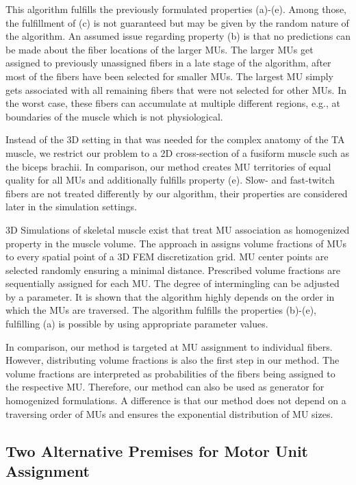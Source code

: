 This algorithm fulfills the previously formulated properties (a)-(e). Among those, the fulfillment of (c) is not guaranteed but may be given by the random nature of the algorithm. An assumed issue regarding property (b) is that no predictions can be made about the fiber locations of the larger MUs. The larger MUs get assigned to previously unassigned fibers in a late stage of the algorithm, after most of the fibers have been selected for smaller MUs. The largest MU simply gets associated with all remaining fibers that were not selected for other MUs. In the worst case, these fibers can accumulate at multiple different regions, e.g., at boundaries of the muscle which is not physiological.

Instead of the 3D setting in \cite{Roehrle2012} that was needed for the complex anatomy of the TA muscle, we restrict our problem to a 2D cross-section of a fusiform muscle such as the biceps brachii. In comparison, our method creates MU territories of equal quality for all MUs and additionally fulfills property (e). Slow- and fast-twitch fibers are not treated differently by our algorithm, their properties are considered later in the simulation settings.

3D Simulations of skeletal muscle exist that treat MU association as homogenized property in the muscle volume. The approach in \cite{harry2018} assigns volume fractions of MUs to every spatial point of a 3D FEM discretization grid. MU center points are selected randomly ensuring a minimal distance. Prescribed volume fractions are sequentially assigned for each MU. The degree of intermingling can be adjusted by a parameter. It is shown that the algorithm highly depends on the order in which the MUs are traversed. The algorithm fulfills the properties (b)-(e), fulfilling (a) is possible by using appropriate parameter values.

In comparison, our method is targeted at MU assignment to individual fibers. However, distributing volume fractions is also the first step in our method. The volume fractions are interpreted as probabilities of the fibers being assigned to the respective MU. Therefore, our method can also be used as generator for homogenized formulations. A difference is that our method does not depend on a traversing order of MUs and ensures the exponential distribution of MU sizes.

\subsection{Two Alternative Premises for Motor Unit Assignment}

